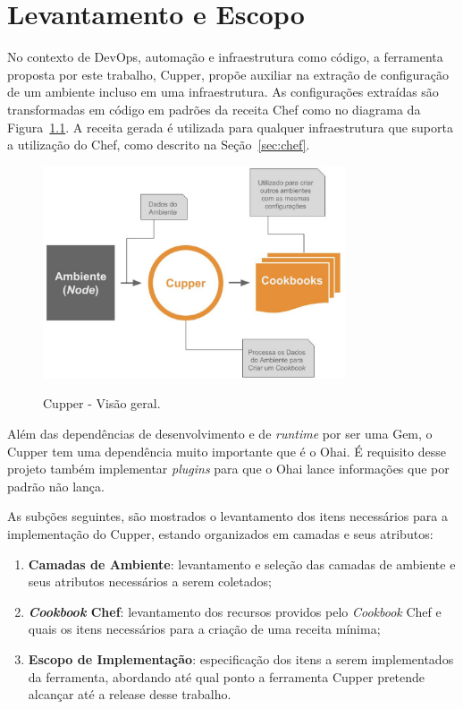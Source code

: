 \newpage\null\thispagestyle{empty}\newpage
\chapter{Levantamento e Escopo}
\label{chap:lev_es}

No contexto de DevOps, automação e infraestrutura como código, a ferramenta
proposta por este trabalho, Cupper, propõe auxiliar na extração de configuração
de um ambiente incluso em uma infraestrutura. As configurações extraídas são
transformadas em código em padrões da receita Chef como 
no diagrama da Figura~\ref{fig:cupper_geral}. A
receita gerada é utilizada para qualquer infraestrutura que suporta a
utilização do Chef, como descrito na Seção~\ref{sec:chef}.

\begin{figure}[H]
  \centering
  \includegraphics[width=0.8\textwidth]{figuras/cupper_geral.eps}
  \label{fig:cupper_geral}
  \caption{Cupper - Visão geral.}
\end{figure}

Além das dependências de desenvolvimento e de \textit{runtime} por ser uma Gem,
o Cupper tem uma dependência muito
importante que é o Ohai. É requisito desse projeto também implementar
\textit{plugins} para que o Ohai lance informações que por padrão 
não lança.

As subções seguintes, são mostrados o levantamento dos itens necessários para
a implementação do Cupper, estando organizados em camadas e seus atributos:

\begin{enumerate}
  \item \textbf{Camadas de Ambiente}: levantamento e seleção das camadas de ambiente
    e seus atributos necessários a serem coletados;
  \item \textbf{\textit{Cookbook} Chef}: levantamento dos recursos providos pelo \textit{Cookbook} Chef e quais os
    itens necessários para a criação de uma receita mínima;
  \item \textbf{Escopo de Implementação}: especificação dos itens a serem implementados
    da ferramenta, abordando até qual ponto a ferramenta Cupper pretende alcançar
    até a release desse trabalho.
\end{enumerate}





